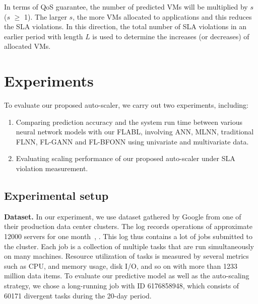 \documentclass[runningheads]{llncs}
\begin{document}


In terms of QoS guarantee, the number of predicted VMs will be multiplied by $s$ ($s$ $\ge$ 1). The larger $s$, the more VMs allocated to applications and this reduces the SLA violations. In this direction, the total number of SLA violations in an earlier period with length $L$ is used to determine the increases (or decreases) of allocated VMs. 



\section{Experiments}
\label{experiments}
To evaluate our proposed auto-scaler, we carry out two experiments, including:

\begin{enumerate}
	\item Comparing prediction accuracy and the system run time between various neural network models with our FLABL, involving ANN, MLNN, traditional FLNN, FL-GANN and FL-BFONN using univariate and multivariate data. 
	\item Evaluating scaling performance of our proposed auto-scaler under SLA violation measurement.
\end{enumerate}



\subsection{Experimental setup}
\label{experimental_setup}

\textbf{Dataset.} In our experiment, we use dataset gathered by Google from one of their production data center clusters. The log records operations of approximate 12000 servers for one month~\cite{clusterdata:Reiss2011}, \cite{ref_google_trace}. This log thus contains a lot of jobs submitted to the cluster. Each job is a collection of multiple tasks that are run simultaneously on many machines. Resource utilization of tasks is measured by several metrics such as CPU, and memory usage, disk I/O, and so on with more than 1233 million data items. To evaluate our predictive model as well as the auto-scaling strategy, we chose a long-running job with ID 6176858948, which consists of 60171 divergent tasks during the 20-day period. 
\end{document}

